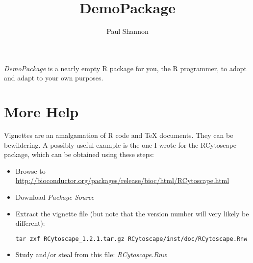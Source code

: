 \documentclass[12pt]{article}
\title{DemoPackage}
\author{Paul Shannon}
\begin{document}
\maketitle

\emph{DemoPackage} is a nearly empty R package for you, the R programmer, to adopt and adapt to your own purposes.  

\section{More Help}
Vignettes are an amalgamation of R code and TeX documents.  They can be bewildering.  A possibly useful example is the one I wrote for the RCytoscape package, which can be obtained using these steps:

\begin{itemize}
  \item Browse to \url{http://bioconductor.org/packages/release/bioc/html/RCytoscape.html}
  \item Download \emph{Package Source}
  \item Extract the vignette file (but note that the version number will very likely be different):
\begin{verbatim}
tar zxf RCytoscape_1.2.1.tar.gz RCytoscape/inst/doc/RCytoscape.Rnw
\end{verbatim}
  \item Study and/or steal from this file: \emph{RCytoscape.Rnw}
\end{itemize}
\end{document}
